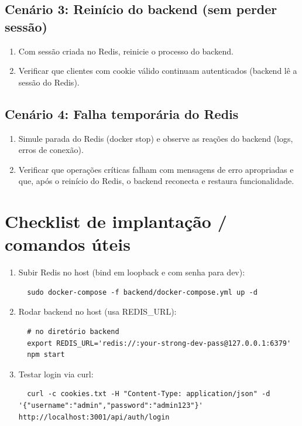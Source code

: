 \documentclass[a4paper,11pt]{article}
\begin{document}
\subsection*{Cenário 3: Reinício do backend (sem perder sessão)}
\begin{enumerate}
  \item Com sessão criada no Redis, reinicie o processo do backend.
  \item Verificar que clientes com cookie válido continuam autenticados (backend lê a sessão do Redis).
\end{enumerate}

\subsection*{Cenário 4: Falha temporária do Redis}
\begin{enumerate}
  \item Simule parada do Redis (docker stop) e observe as reações do backend (logs, erros de conexão).
  \item Verificar que operações críticas falham com mensagens de erro apropriadas e que, após o reinício do Redis, o backend reconecta e restaura funcionalidade.
\end{enumerate}

\section{Checklist de implantação / comandos úteis}
\begin{enumerate}
  \item Subir Redis no host (bind em loopback e com senha para dev):
  \begin{lstlisting}
  sudo docker-compose -f backend/docker-compose.yml up -d
  \end{lstlisting}
  \item Rodar backend no host (usa REDIS_URL):
  \begin{lstlisting}
  # no diretório backend
  export REDIS_URL='redis://:your-strong-dev-pass@127.0.0.1:6379'
  npm start
  \end{lstlisting}
  \item Testar login via curl:
  \begin{lstlisting}
  curl -c cookies.txt -H "Content-Type: application/json" -d '{"username":"admin","password":"admin123"}' http://localhost:3001/api/auth/login
  \end{lstlisting}
\end{enumerate}
\end{document}
